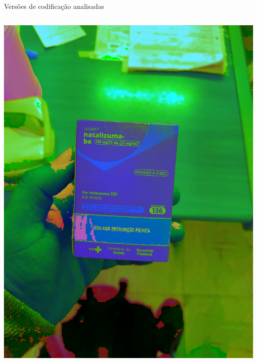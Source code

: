 \begin{frame}{Versões de codificação analisadas}
\begin{columns}
\begin{column}{0.45\textwidth}
\begin{columns}
\begin{column}{0.5\textwidth}
					\includegraphics[height=0.3\textheight]{../pictures/tysabri_HLS.jpg}


\end{column}
\end{columns}
\end{column}
\end{columns}
\end{frame}
